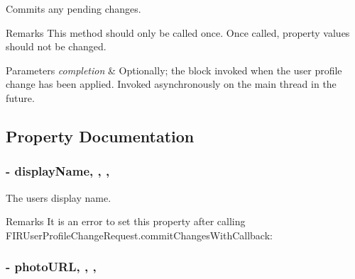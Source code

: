 Commits any pending changes. 

\begin{DoxyRemark}{Remarks}
This method should only be called once. Once called, property values should not be changed. 
\end{DoxyRemark}

\begin{DoxyParams}{Parameters}
{\em completion} & Optionally; the block invoked when the user profile change has been applied. Invoked asynchronously on the main thread in the future. \\
\hline
\end{DoxyParams}


\subsection{Property Documentation}
\hypertarget{interface_f_i_r_user_profile_change_request_a63dd61c44c81de940e3129161b67a8eb}{}
\subsubsection[{display\+Name}]{\setlength{\rightskip}{0pt plus 5cm}-\/ display\+Name\hspace{0.3cm}{\ttfamily [read]}, {\ttfamily [write]}, {\ttfamily [nonatomic]}, {\ttfamily [copy]}}\label{interface_f_i_r_user_profile_change_request_a63dd61c44c81de940e3129161b67a8eb}


The user\textquotesingle{}s display name. 

\begin{DoxyRemark}{Remarks}
It is an error to set this property after calling {\ttfamily F\+I\+R\+User\+Profile\+Change\+Request.\+commit\+Changes\+With\+Callback\+:} 
\end{DoxyRemark}
\hypertarget{interface_f_i_r_user_profile_change_request_a35b38b02ce93ed1104f66021f8c8e620}{}
\subsubsection[{photo\+U\+R\+L}]{\setlength{\rightskip}{0pt plus 5cm}-\/ photo\+U\+R\+L\hspace{0.3cm}{\ttfamily [read]}, {\ttfamily [write]}, {\ttfamily [nonatomic]}, {\ttfamily [copy]}}\label{interface_f_i_r_user_profile_change_request_a35b38b02ce93ed1104f66021f8c8e620}


